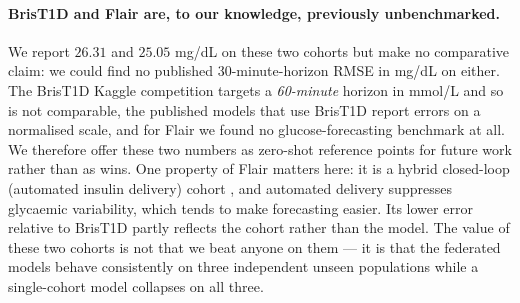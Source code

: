 \documentclass[10pt,letterpaper]{article}
\begin{document}
\paragraph{BrisT1D and Flair are, to our knowledge, previously unbenchmarked.}
We report $26.31$ and $25.05$ mg/dL on these two cohorts but make no
comparative claim: we could find no published 30-minute-horizon RMSE in mg/dL
on either. The BrisT1D Kaggle competition \cite{kaggle2024brist1d} targets a
\emph{60-minute} horizon in mmol/L and so is not comparable, the published
models that use BrisT1D report errors on a normalised scale, and for Flair we
found no glucose-forecasting benchmark at all. We therefore offer these two
numbers as zero-shot reference points for future work rather than as wins.
One property of Flair matters here: it is a hybrid closed-loop (automated
insulin delivery) cohort \cite{bergenstal2021flair}, and automated delivery
suppresses glycaemic variability, which tends to make forecasting easier. Its
lower error relative to BrisT1D partly reflects the cohort rather than the
model. The value of
these two cohorts is not that we beat anyone on them --- it is that the
federated models behave consistently on three independent unseen populations
while a single-cohort model collapses on all three.
\end{document}
